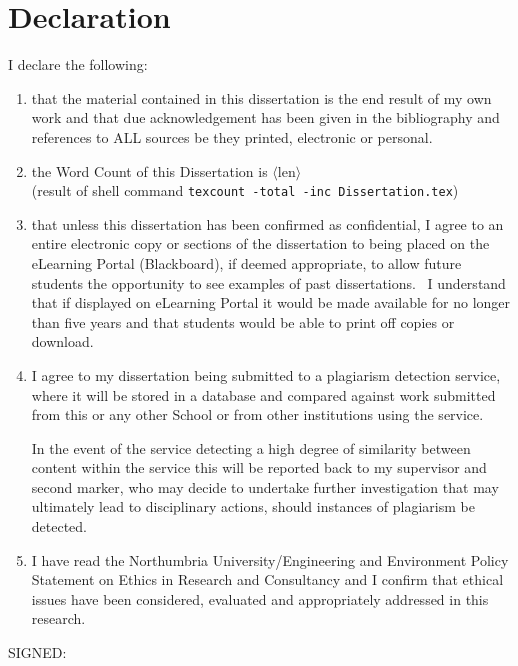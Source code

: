 
\chapter{Declaration}

I declare the following:

\begin{enumerate}

\item that the material contained in this dissertation is the end result of my own work and that due acknowledgement has been given in the bibliography and references to ALL sources be they printed, electronic or personal.

\item the Word Count of this Dissertation is $\langle\mathrm{len}\rangle$\\
(result of shell command \texttt{texcount -total -inc Dissertation.tex})

\item that unless this dissertation has been confirmed as confidential, I agree to an entire electronic copy or sections of the dissertation to being placed on the eLearning Portal (Blackboard), if deemed appropriate, to allow future students the opportunity to see examples of past dissertations.  I understand that if displayed on eLearning Portal it would be made available for no longer than five years and that students would be able to print off copies or download. 

\item I agree to my dissertation being submitted to a plagiarism detection service, where it will be stored in a database and compared against work submitted from this or any other School or from other institutions using the service. 

In the event of the service detecting a high degree of similarity between content within the service this will be reported back to my supervisor and second marker, who may decide to undertake further investigation that may ultimately lead to disciplinary actions, should instances of plagiarism be detected.

\item I have read the Northumbria University/Engineering and Environment Policy Statement on Ethics in Research and Consultancy and I confirm that ethical issues have been considered, evaluated and appropriately addressed in this research.
\end{enumerate}
\vspace{1in}
\large{SIGNED:\dotfill}

